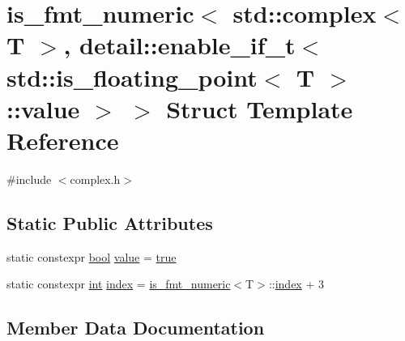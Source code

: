 \hypertarget{structis__fmt__numeric_3_01std_1_1complex_3_01_t_01_4_00_01detail_1_1enable__if__t_3_01std_1_1is996a96e2979aed124e8880b0fa5542e3}{}\section{is\+\_\+fmt\+\_\+numeric$<$ std\+::complex$<$ T $>$, detail\+::enable\+\_\+if\+\_\+t$<$ std\+::is\+\_\+floating\+\_\+point$<$ T $>$\+::value $>$ $>$ Struct Template Reference}
\label{structis__fmt__numeric_3_01std_1_1complex_3_01_t_01_4_00_01detail_1_1enable__if__t_3_01std_1_1is996a96e2979aed124e8880b0fa5542e3}


{\ttfamily \#include $<$complex.\+h$>$}

\subsection*{Static Public Attributes}
\begin{DoxyCompactItemize}
\item 
static constexpr \mbox{\hyperlink{asdl_8h_af6a258d8f3ee5206d682d799316314b1}{bool}} \mbox{\hyperlink{structis__fmt__numeric_3_01std_1_1complex_3_01_t_01_4_00_01detail_1_1enable__if__t_3_01std_1_1is996a96e2979aed124e8880b0fa5542e3_a47c41f5f57683eb0ffed8f94dd7d3692}{value}} = \mbox{\hyperlink{asdl_8h_af6a258d8f3ee5206d682d799316314b1a08f175a5505a10b9ed657defeb050e4b}{true}}
\item 
static constexpr \mbox{\hyperlink{warnings_8h_a74f207b5aa4ba51c3a2ad59b219a423b}{int}} \mbox{\hyperlink{structis__fmt__numeric_3_01std_1_1complex_3_01_t_01_4_00_01detail_1_1enable__if__t_3_01std_1_1is996a96e2979aed124e8880b0fa5542e3_a0d8eea5b7690be8fb121a3be5ec5d017}{index}} = \mbox{\hyperlink{structis__fmt__numeric}{is\+\_\+fmt\+\_\+numeric}}$<$T$>$\+::\mbox{\hyperlink{_s_d_l__opengl__glext_8h_a57f14e05b1900f16a2da82ade47d0c6d}{index}} + 3
\end{DoxyCompactItemize}


\subsection{Member Data Documentation}
\mbox{\label{structis__fmt__numeric_3_01std_1_1complex_3_01_t_01_4_00_01detail_1_1enable__if__t_3_01std_1_1is996a96e2979aed124e8880b0fa5542e3_a0d8eea5b7690be8fb121a3be5ec5d017}} 
